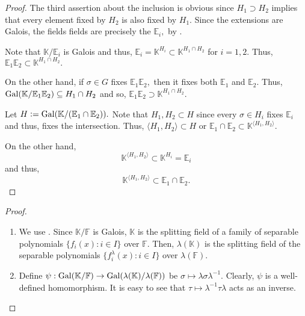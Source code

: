 \galoissubgroupscompositum*\label{thm:galoissubgroupscompositum2}
\begin{flushright}\hyperref[thm:galoissubgroupscompositum]{\upsym}\end{flushright}
\begin{proof}
    The third assertion about the inclusion is obvious since $H_1 \supset H_2$ implies that every element fixed by $H_2$ is also fixed by $H_1.$ Since the extensions are Galois, the fields fields are precisely the $\mathbb{E}_i,$ by .

    Note that $\mathbb{K}/\mathbb{E}_i$ is Galois and thus, $\mathbb{E}_i = \mathbb{K}^{H_i} \subset \mathbb{K}^{H_1 \cap H_2}$ for $i = 1, 2.$ Thus, $\mathbb{E}_1\mathbb{E}_2 \subset \mathbb{K}^{H_1 \cap H_2}.$

    On the other hand, if $\sigma \in G$ fixes $\mathbb{E}_1\mathbb{E}_2,$ then it fixes both $\mathbb{E}_1$ and $\mathbb{E}_2.$ Thus, $\operatorname{Gal}(\mathbb{K}/\mathbb{E}_1\mathbb{E}_2) \subseteq H_1 \cap H_2$ and so, $\mathbb{E}_1\mathbb{E}_2 \supset \mathbb{K}^{H_1 \cap H_2}.$

    Let $H \vcentcolon= \operatorname{Gal}(\mathbb{K}/(\mathbb{E}_1 \cap \mathbb{E}_2)).$ Note that $H_1, H_2 \subset H$ since every $\sigma \in H_i$ fixes $\mathbb{E}_i$ and thus, fixes the intersection. Thus, $\langle H_1, H_2\rangle \subset H$ or $\mathbb{E}_1 \cap \mathbb{E}_2 \subset \mathbb{K}^{\langle H_1, H_2\rangle}.$

    On the other hand, 
    \begin{equation*} 
        \mathbb{K}^{\langle H_1, H_2\rangle} \subset \mathbb{K}^{H_i} = \mathbb{E}_i
    \end{equation*}
    and thus,
    \begin{equation*} 
        \mathbb{K}^{\langle H_1, H_2\rangle} \subset \mathbb{E}_1 \cap \mathbb{E}_2.
    \end{equation*}
\end{proof}

\isomorphismgalois*\label{prop:isomorphismgalois2}
\begin{flushright}\hyperref[prop:isomorphismgalois]{\upsym}\end{flushright}
\begin{proof}
    \phantom{hi}
    \begin{enumerate}[leftmargin=*]
        \item We use . Since $\mathbb{K}/\mathbb{F}$ is Galois, $\mathbb{K}$ is the splitting field of a family of separable polynomials $\{f_i(x) : i \in I\}$ over $\mathbb{F}.$ Then, $\lambda(\mathbb{K})$ is the splitting field of the separable polynomials $\{f^{\lambda}_i(x) : i \in I\}$ over $\lambda(\mathbb{F}).$
        \item Define $\psi : \operatorname{Gal}(\mathbb{K}/\mathbb{F}) \to \operatorname{Gal}(\lambda(\mathbb{K})/\lambda(\mathbb{F}))$ be $\sigma \mapsto \lambda\sigma\lambda^{-1}.$ Clearly, $\psi$ is a well-defined homomorphism. It is easy to see that $\tau \mapsto \lambda^{-1}\tau\lambda$ acts as an inverse. \qedhere
    \end{enumerate}
\end{proof}

